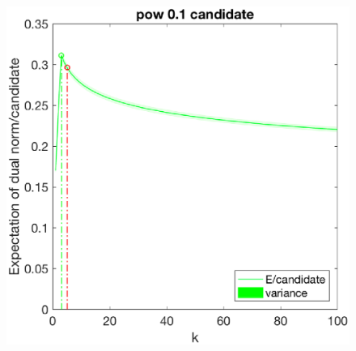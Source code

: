 \documentclass[12pt]{article}
\begin{document}
\begin{figure}[h]
\begin{minipage}[c]{.3\linewidth}
    \end{minipage}
    \hfill%
    \begin{minipage}[c]{.3\linewidth}
        \centering
        \includegraphics[width=\linewidth]{Fig/dualnorm-u0rand-k0-5-candidatepow.eps}
    \end{minipage}
\end{figure}
\end{document}

